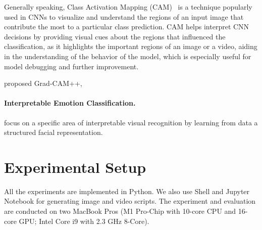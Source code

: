 Generally speaking, 
Class Activation Mapping (CAM)~\cite{ZhouKLOT16} is a technique popularly used in CNNs to visualize and understand the regions of an input image that contribute the most to a particular class prediction. 
CAM helps interpret CNN decisions by providing visual cues about the regions that influenced the classification, 
as it highlights the important regions of an image or a video, 
aiding in the understanding of the behavior of the model, 
which is especially useful for model debugging and further improvement. 


\citet{chattopadhay2018grad} proposed Grad-CAM++,


\paragraph{Interpretable Emotion Classification.}

\citet{YinTLS019} focus on a specific area of interpretable visual recognition by learning from data a structured facial representation. 
\citet{Malik0R21} 

\section{Experimental Setup}
\label{sec:setup}

All the experiments are implemented in Python. 
We also use Shell and Jupyter Notebook for generating image and video scripts. 
The experiment and evaluation are conducted on two MacBook Pros 
(M1 Pro-Chip with 10-core CPU and 16-core GPU; Intel Core i9 with 2.3 GHz 8-Core). 

